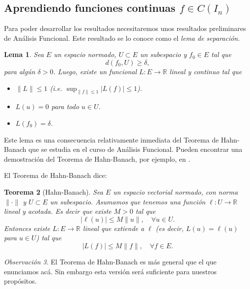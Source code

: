 \documentclass[12pt, a4paper]{amsbook}
\newcommand{\R}{{\mathbb R}}
\newtheorem{teo}{Teorema}[section]
\newtheorem{lema}[teo]{Lema}
\theoremstyle{remark}
\newtheorem{obs}[teo]{Observaci\'on}
\theoremstyle{definition}
\numberwithin{section}{chapter}
\numberwithin{subsection}{section}
\numberwithin{equation}{section}
\numberwithin{figure}{chapter}
\begin{document}
\subsection{Aprendiendo funciones continuas $f\in C(I_n)$}

Para poder desarrollar los resultados necesitaremos unos resultados preliminares de Análisis Funcional. Este resultado se lo conoce como el {\em lema de separación}.

\begin{lema}\label{lema.separacion}
Sea $E$ un espacio normado, $U\subset E$ un subespacio y $f_0\in E$ tal que
$$
d(f_0, U)\ge\delta,
$$
para algún $\delta>0$. Luego, existe un funcional $L\colon E\to\R$ lineal y continuo tal que
\begin{itemize}
\item[(a)] $\|L\|\le 1$ (i.e. $\sup_{\|f\|\le 1} |L(f)|\le 1$).

\item[(b)] $L(u)=0$ para todo $u\in U$.

\item[(c)] $L(f_0)=\delta$.
\end{itemize}
\end{lema}

Este lema es una consecuencia relativamente inmediata del Teorema de Hahn-Banach que se estudia en el curso de Análisis Funcional. Pueden encontrar una demostración del Teorema de Hahn-Banach, por ejemplo, en \cite{Brezis}.

El Teorema de Hahn-Banach dice:
\begin{teo}[Hahn-Banach]\label{HB}
Sea $E$ un espacio vectorial normado, con norma $\|\cdot\|$ y $U\subset E$ un subespacio. Asumamos que tenemos una función $\ell\colon U\to \R$ lineal y acotada. Es decir que existe $M>0$ tal que
$$
|\ell(u)|\le M\|u\|,\quad \forall u\in U.
$$
Entonces existe $L\colon E\to\R$ lineal que extiende a $\ell$ (es decir, $L(u)=\ell(u)$ para $u\in U$) tal que 
$$
|L(f)|\le M\|f\|, \quad \forall f\in E.
$$
\end{teo}

\begin{obs}
El Teorema de Hahn-Banach es más general que el que enunciamos acá. Sin embargo esta versión será suficiente para nuestros propósitos.
\end{obs}
\end{document}
